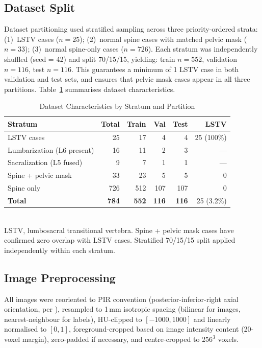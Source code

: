 \documentclass{article}
\begin{document}
\subsection{Dataset Split}

Dataset partitioning used stratified sampling across three priority-ordered
strata: (1)~LSTV cases ($n{=}25$); (2)~normal spine cases with matched pelvic
mask ($n{=}33$); (3)~normal spine-only cases ($n{=}726$). Each stratum was
independently shuffled (seed = 42) and split 70/15/15, yielding:
train $n{=}552$, validation $n{=}116$, test $n{=}116$. This guarantees a
minimum of 1 LSTV case in both validation and test sets, and ensures that
pelvic mask cases appear in all three partitions.
Table~\ref{tab:dataset} summarises dataset characteristics.

\begin{table}[ht]
\centering
\caption{Dataset Characteristics by Stratum and Partition}
\label{tab:dataset}
\begin{tabular}{lrrrrr}
\toprule
Stratum & Total & Train & Val & Test & LSTV \\
\midrule
LSTV cases                       & 25  & 17  & 4   & 4   & 25 (100\%) \\
\quad Lumbarization (L6 present) & 16  & 11  & 2   & 3   & ---        \\
\quad Sacralization (L5 fused)   &  9  &  7  & 1   & 1   & ---        \\
Spine + pelvic mask              & 33  & 23  & 5   & 5   & 0          \\
Spine only                       & 726 & 512 & 107 & 107 & 0          \\
\midrule
\textbf{Total}                   & \textbf{784} & \textbf{552} &
  \textbf{116} & \textbf{116} & 25 (3.2\%) \\
\bottomrule
\end{tabular}\\[2pt]
\footnotesize{LSTV, lumbosacral transitional vertebra.
Spine + pelvic mask cases have confirmed zero overlap with LSTV cases.
Stratified 70/15/15 split applied independently within each stratum.}
\end{table}

\subsection{Image Preprocessing}

All images were reoriented to PIR convention (posterior-inferior-right axial
orientation, per \citealt{li2025spinenet}), resampled to 1\,mm isotropic
spacing (bilinear for images, nearest-neighbour for labels), HU-clipped to
$[-1000, 1000]$ and linearly normalised to $[0,1]$, foreground-cropped based
on image intensity content (20-voxel margin), zero-padded if necessary, and
centre-cropped to $256^3$ voxels.
\end{document}
